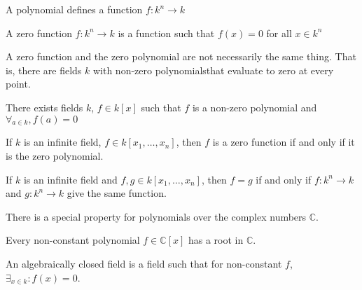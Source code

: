                 \begin{remark}
                    A polynomial defines a function
                    $f:k^{n}\rightarrow{k}$
                \end{remark}
                \begin{definition}
                    A zero function $f:k^{n}\rightarrow{k}$
                    is a function such that $f(x)=0$
                    for all $x\in{k^{n}}$
                \end{definition}
                \begin{remark}
                    A zero function and the zero polynomial are
                    not necessarily the same thing. That is,
                    there are fields $k$ with non-zero
                    polynomialsthat evaluate to
                    zero at every point.
                \end{remark}
                \begin{theorem}
                    There exists fields $k$, $f\in k[x]$ such
                    that $f$ is a non-zero polynomial and
                    $\forall_{a\in k},f(a)=0$
                \end{theorem}
                \begin{theorem}
                    If $k$ is an infinite field,
                    $f\in k[x_1,\hdots ,x_n]$, then $f$ is a
                    zero function if and only if it is
                    the zero polynomial.
                \end{theorem}
                \begin{theorem}
                    If $k$ is an infinite field and
                    $f,g\in k[x_1,\hdots,x_n]$, then $f=g$ if and
                    only if $f:k^n\rightarrow k$ and
                    $g:k^n \rightarrow k$ give
                    the same function.
                \end{theorem}
                There is a special property for polynomials
                over the complex numbers $\mathbb{C}$.
                \begin{theorem}
                    Every non-constant polynomial
                    $f\in\mathbb{C}[x]$ has a root in $\mathbb{C}$.
                \end{theorem}
                \begin{definition}
                    An algebraically closed field is a field
                    such that for non-constant $f$,
                    $\exists_{x\in k}:f(x)=0$.
                \end{definition}
